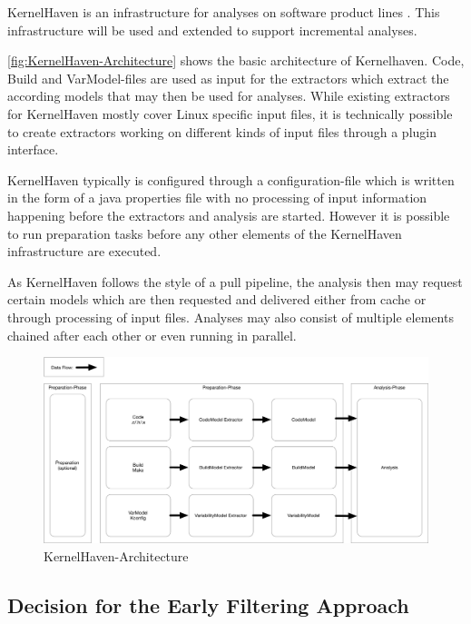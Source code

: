 \documentclass[a4paper]{article}
\begin{document}
KernelHaven is an infrastructure for analyses on software product lines \cite{KroeherEl-SharkawySchmid18}. This infrastructure will be used and extended to support incremental analyses. 

\autoref{fig:KernelHaven-Architecture} shows the basic architecture of Kernelhaven. Code, Build and VarModel-files are used as input for the extractors which extract the according models that may then be used for analyses. While existing extractors for KernelHaven mostly cover Linux specific input files, it is technically possible to create extractors working on different kinds of input files through a plugin interface.

KernelHaven typically is configured through a configuration-file which is written in the form of a java properties file with no processing of input information happening before the extractors and analysis are started. However it is possible to run preparation tasks before any other elements of the KernelHaven infrastructure are executed.

As KernelHaven follows the style of a pull pipeline, the analysis then may request certain models which are then requested and delivered either from cache or through processing of input files. Analyses may also consist of multiple elements chained after each other or even running in parallel.

\begin{figure}[htbp] 
  \centering
  \begin{minipage}[b]{1\textwidth} 
    \caption[KernelHaven-Architecture]{KernelHaven-Architecture}\label{fig:KernelHaven-Architecture}
    \includegraphics[width=1\textwidth]{img/KernelHaven.pdf}
  \end{minipage}
\end{figure}




\subsection{Decision for the Early Filtering Approach }
\end{document}
